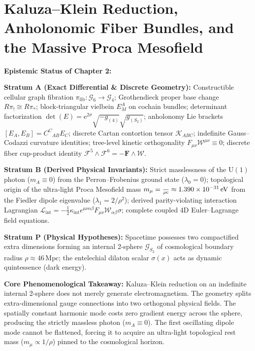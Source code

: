 \documentclass[
    12pt,
    a4paper,
    headings=normal,
    twoside=false,
    open=any,
    parskip=half
]{scrbook}
\let\hbar\relax
\newcommand{\eu}{\mathrm{e}}
\begin{document}
\chapter{Kaluza--Klein Reduction, Anholonomic Fiber Bundles, and the Massive Proca Mesofield}
\label{chap:ch2_expanded}

\begin{firewallbox}
\textbf{Epistemic Status of Chapter 2:}\par\smallskip\noindent
\textbf{Stratum A (Exact Differential \& Discrete Geometry):} Constructible cellular graph fibration $\pi_{\text{fib}} \colon \mathcal{G}_6 \to \mathcal{G}_4$; Grothendieck proper base change $R\pi_! \cong R\pi_*$; block-triangular vielbein $E^A_M$ on cochain bundles; determinant factorization $\det(E) = \eu^{2\sigma}\sqrt{-g_{(4)}}\sqrt{g_{(S_2)}}$; anholonomy Lie brackets $[E_A, E_B] = C^C_{\phantom{C}AB}E_C$; discrete Cartan contortion tensor $\mathcal{K}_{ABC}$; indefinite Gauss--Codazzi curvature identities; tree-level kinetic orthogonality $F_{\mu\nu}\mathcal{W}^{\mu\nu} \equiv 0$; discrete fiber cup-product identity $\mathcal{F}^5 \wedge \mathcal{F}^6 = -\mathbf{F} \wedge \boldsymbol{\mathcal{W}}$.\par\smallskip\noindent
\textbf{Stratum B (Derived Physical Invariants):} Strict masslessness of the $\mathrm{U}(1)$ photon ($m_A \equiv 0$) from the Perron--Frobenius ground state ($\lambda_0 = 0$); topological origin of the ultra-light Proca Mesofield mass $m_\mu = \frac{\hbar}{\rho c} \approx 1.390 \times 10^{-31}\,\text{eV}$ from the Fiedler dipole eigenvalue ($\lambda_1 = 2/\rho^2$); derived parity-violating interaction Lagrangian $\mathcal{L}_{\text{int}} = -\frac{1}{2}\kappa_{\text{int}}\epsilon^{\mu\nu\alpha\beta}F_{\mu\nu}\mathcal{W}_{\alpha\beta}\sigma$; complete coupled 4D Euler--Lagrange field equations.\par\smallskip\noindent
\textbf{Stratum P (Physical Hypotheses):} Spacetime possesses two compactified extra dimensions forming an internal 2-sphere $\mathcal{G}_{S_2}$ of cosmological boundary radius $\rho \approx 46\,\text{Mpc}$; the entelechial dilaton scalar $\sigma(x)$ acts as dynamic quintessence (dark energy).\par\smallskip\noindent
\textbf{Core Phenomenological Takeaway:} Kaluza--Klein reduction on an indefinite internal 2-sphere does not merely generate electromagnetism. The geometry splits extra-dimensional gauge connections into two orthogonal physical fields. The spatially constant harmonic mode costs zero gradient energy across the sphere, producing the strictly massless photon ($m_A \equiv 0$). The first oscillating dipole mode cannot be flattened, forcing it to acquire an ultra-light topological rest mass ($m_\mu \propto 1/\rho$) pinned to the cosmological horizon.
\end{firewallbox}
\end{document}
